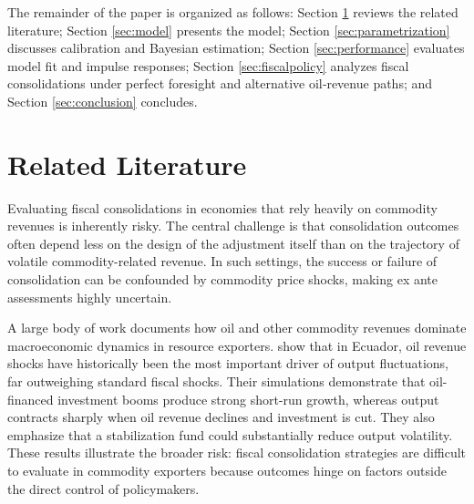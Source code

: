 \documentclass[12pt]{article}
\begin{document}
The remainder of the paper is organized as follows: Section \ref{sec:literature} reviews the related literature; Section \ref{sec:model} presents the model; Section \ref{sec:parametrization} discusses calibration and Bayesian estimation; Section \ref{sec:performance} evaluates model fit and impulse responses; Section \ref{sec:fiscalpolicy} analyzes fiscal consolidations under perfect foresight and alternative oil‑revenue paths; and Section \ref{sec:conclusion} concludes.


\section{Related Literature}\label{sec:literature}


Evaluating fiscal consolidations in economies that rely heavily on commodity revenues is inherently risky. The central challenge is that consolidation outcomes often depend less on the design of the adjustment itself than on the trajectory of volatile commodity-related revenue. In such settings, the success or failure of consolidation can be confounded by commodity price shocks, making ex ante assessments highly uncertain.

A large body of work documents how oil and other commodity revenues dominate macroeconomic dynamics in resource exporters. \citet{GarciaAlban2021} show that in Ecuador, oil revenue shocks have historically been the most important driver of output fluctuations, far outweighing standard fiscal shocks. Their simulations demonstrate that oil-financed investment booms produce strong short-run growth, whereas output contracts sharply when oil revenue declines and investment is cut. They also emphasize that a stabilization fund could substantially reduce output volatility. These results illustrate the broader risk: fiscal consolidation strategies are difficult to evaluate in commodity exporters because outcomes hinge on factors outside the direct control of policymakers.
\end{document}
